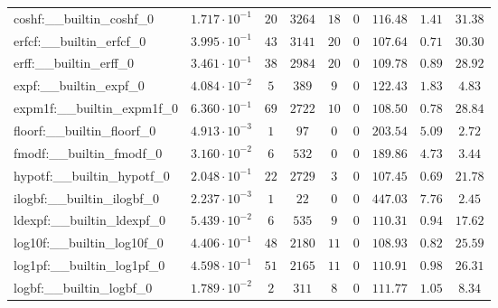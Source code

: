 \begin{tabular}{|l|c|c|c|c|c|c|c|c|}
coshf:\_\_builtin\_coshf\_0               & $ 1.717 \cdot 10^{-1} $ & $ 20     $ & $ 3264  $ & $ 18  $ & $ 0   $ & $ 116.48      $ & $ 1.41    $ & $ 31.38   $ \\
erfcf:\_\_builtin\_erfcf\_0               & $ 3.995 \cdot 10^{-1} $ & $ 43     $ & $ 3141  $ & $ 20  $ & $ 0   $ & $ 107.64      $ & $ 0.71    $ & $ 30.30   $ \\
erff:\_\_builtin\_erff\_0                 & $ 3.461 \cdot 10^{-1} $ & $ 38     $ & $ 2984  $ & $ 20  $ & $ 0   $ & $ 109.78      $ & $ 0.89    $ & $ 28.92   $ \\
expf:\_\_builtin\_expf\_0                 & $ 4.084 \cdot 10^{-2} $ & $ 5      $ & $ 389   $ & $ 9   $ & $ 0   $ & $ 122.43      $ & $ 1.83    $ & $ 4.83    $ \\
expm1f:\_\_builtin\_expm1f\_0             & $ 6.360 \cdot 10^{-1} $ & $ 69     $ & $ 2722  $ & $ 10  $ & $ 0   $ & $ 108.50      $ & $ 0.78    $ & $ 28.84   $ \\
floorf:\_\_builtin\_floorf\_0             & $ 4.913 \cdot 10^{-3} $ & $ 1      $ & $ 97    $ & $ 0   $ & $ 0   $ & $ 203.54      $ & $ 5.09    $ & $ 2.72    $ \\
fmodf:\_\_builtin\_fmodf\_0               & $ 3.160 \cdot 10^{-2} $ & $ 6      $ & $ 532   $ & $ 0   $ & $ 0   $ & $ 189.86      $ & $ 4.73    $ & $ 3.44    $ \\
hypotf:\_\_builtin\_hypotf\_0             & $ 2.048 \cdot 10^{-1} $ & $ 22     $ & $ 2729  $ & $ 3   $ & $ 0   $ & $ 107.45      $ & $ 0.69    $ & $ 21.78   $ \\
ilogbf:\_\_builtin\_ilogbf\_0             & $ 2.237 \cdot 10^{-3} $ & $ 1      $ & $ 22    $ & $ 0   $ & $ 0   $ & $ 447.03      $ & $ 7.76    $ & $ 2.45    $ \\
ldexpf:\_\_builtin\_ldexpf\_0             & $ 5.439 \cdot 10^{-2} $ & $ 6      $ & $ 535   $ & $ 9   $ & $ 0   $ & $ 110.31      $ & $ 0.94    $ & $ 17.62   $ \\
log10f:\_\_builtin\_log10f\_0             & $ 4.406 \cdot 10^{-1} $ & $ 48     $ & $ 2180  $ & $ 11  $ & $ 0   $ & $ 108.93      $ & $ 0.82    $ & $ 25.59   $ \\
log1pf:\_\_builtin\_log1pf\_0             & $ 4.598 \cdot 10^{-1} $ & $ 51     $ & $ 2165  $ & $ 11  $ & $ 0   $ & $ 110.91      $ & $ 0.98    $ & $ 26.31   $ \\
logbf:\_\_builtin\_logbf\_0               & $ 1.789 \cdot 10^{-2} $ & $ 2      $ & $ 311   $ & $ 8   $ & $ 0   $ & $ 111.77      $ & $ 1.05    $ & $ 8.34    $ \\

\end{tabular}
